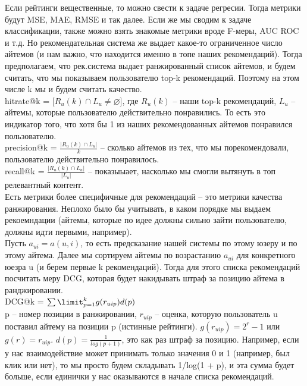 Если рейтинги вещественные, то можно свести к задаче регресии. Тогда метрики будут MSE, MAE, RMSE и так далее. Если же мы сводим к задаче классификации, также можно взять знакомые метрики вроде F-меры, AUC ROC и т.д. Но рекомендательная система же выдает какое-то ограниченное число айтемов (и нам важно, что находится именно в топе наших рекомендаций). Тогда предполагаем, что рек.система выдает ранжированный список айтемов, и будем считать, что мы показываем пользователю top-k рекомендаций. Поэтому на этом числе k мы и будем считать качество. \\ 

hitrate@k = [$R_{u}(k) \cap L_{u} \ne \varnothing$], где $R_{u}(k)$ – наши top-k рекомендаций, $L_{u}$ -- айтемы, которые пользователю действительно понравились. То есть это индикатор того, что хотя бы 1 из наших рекомендованных айтемов понравился пользователю. \\ 

precision@k = $\frac{|R_{u}(k) \cap L_{u}|}{k}$ -- сколько айтемов из тех, что мы порекомендовали, пользователю действительно понравилось. \\ 

recall@k = $\frac{|R_{u}(k) \cap L_{u}|}{|L_{u}|}$ -- показыыает, насколько мы смогли вытянуть в топ релевантный контент. \\ 

Есть метрики более специфичные для рекомендаций -- это метрики качества ранжирования. Неплохо было бы учитывать, в каком порядке мы выдаем рекоемндации (айтемы, которые по идее должны сильно зайти пользователю, должны идти первыми, например). \\ 

Пусть $a_{ui} = a(u, i)$, то есть предсказание нашей системы по этому юзеру и по этому айтема. Далее мы сортируем айтемы по возрастанию $a_{ui}$ для конкретного юезра u (и берем первые k рекомендаций). Тогда для этого списка рекомендаций посчитать меру DCG, которая будет накидывать штраф за позицию айтема в ранджировании. \\ 

DCG@k = $\sum\limit_{p = 1}^{k} g(r_{uip})d(p)$ \\ 

p -- номер позиции в ранжировании, $r_{uip}$ -- оценка, которую пользователь u поставил айтему на позиции p (истинные рейтинги). $g(r_{uip}) = 2^{r} - 1$ или $g(r) = r_{uip}$.  $d(p) = \frac{1}{log(p + 1)}$, это как раз штраф за позицию. Например, если у нас взаимодействие может принимать только значения 0 и 1 (например, был клик или нет), то мы просто будем складывать 1/log(1 + p), и эта сумма будет больше, если единички у нас оказываются в начале списка рекомендаций. \\ 

